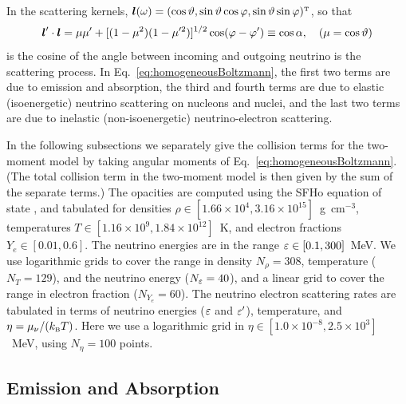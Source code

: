 \documentclass[10pt,preprint]{aastex}
\begin{document}
In the scattering kernels, $\boldsymbol{l}(\omega)=(\cos\vartheta,\sin\vartheta\cos\varphi,\sin\vartheta\sin\varphi)^{\mbox{\tiny T}}$, so that
\begin{equation}
 \boldsymbol{l}'\cdot\boldsymbol{l}  = \mu\mu' + [(1-\mu^2)(1-\mu'^{2})]^{1/2}\cos(\varphi-\varphi')
 \equiv \cos\alpha,
 \quad(\mu=\cos\vartheta)
\end{equation}
is the cosine of the angle between incoming and outgoing neutrino is the scattering process.  
In Eq.~\eqref{eq:homogeneousBoltzmann}, the first two terms are due to emission and absorption, the third and fourth terms are due to elastic (isoenergetic) neutrino scattering on nucleons and nuclei, and the last two terms are due to inelastic (non-isoenergetic) neutrino-electron scattering.  

In the following subsections we separately give the collision terms for the two-moment model by taking angular moments of Eq.~\eqref{eq:homogeneousBoltzmann}.  
(The total collision term in the two-moment model is then given by the sum of the separate terms.)  
The opacities are computed using the SFHo equation of state \citep{steiner_etal_2013}, and tabulated for densities $\rho\in[1.66\times10^{4},3.16\times10^{15}]$~g~cm$^{-3}$, temperatures $T\in[1.16\times10^{9},1.84\times10^{12}]$~K, and electron fractions $Y_{e}\in[0.01,0.6]$.  
The neutrino energies are in the range $\varepsilon\in[0.1,300]$~MeV.  
We use logarithmic grids to cover the range in density $N_{\rho}=308$, temperature ($N_{T}=129$), and the neutrino energy ($N_{\varepsilon}=40$), and a linear grid to cover the range in electron fraction ($N_{Y_{e}}=60$).  
The neutrino electron scattering rates are tabulated in terms of neutrino energies ($\varepsilon$ and $\varepsilon'$), temperature, and $\eta=\mu_{\nu}/(k_{\mbox{\tiny B}}T)$.  
Here we use a logarithmic grid in $\eta\in[1.0\times10^{-8},2.5\times10^{3}]$~MeV, using $N_{\eta}=100$ points.  

\subsection{Emission and Absorption}
\end{document}
